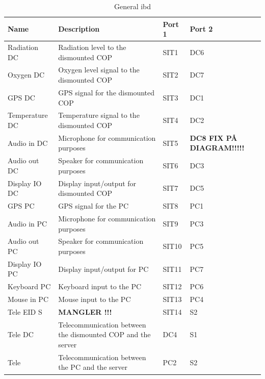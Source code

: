 \begin{table}[H]  
\centering

\begin{tabular}{|l|p{8cm}|l|l|} 
\hline
	\textbf{Name}		& \textbf{Description}						  & \textbf{Port 1} & \textbf{Port 2} \\\hline
  Radiation DC				&  Radiation level to the dismounted COP 	 					   & SIT1 & DC6 \\\hline
  Oxygen DC					&  Oxygen level signal to the dismounted COP				   & SIT2 & DC7 \\\hline
  GPS DC					&  GPS signal for the dismounted COP 	 					   & SIT3 & DC1 \\\hline   
  Temperature DC			&  Temperature signal to the dismounted COP 	 					   & SIT4 & DC2 \\\hline     
  Audio in DC				&  Microphone for communication purposes 	 				   & SIT5 &\textbf{ DC8  FIX PÅ DIAGRAM!!!!!}\\\hline     
  Audio out DC				&  Speaker for communication purposes 	 					   & SIT6 & DC3 \\\hline     
  Display IO DC				&  Display input/output for dismounted COP 	 					   & SIT7 & DC5 \\\hline     
  
  GPS PC					&  GPS signal for the PC			 	 					   & SIT8 & PC1 \\\hline     
  Audio in PC				&  Microphone for communication purposes 	 					   & SIT9 & PC3 \\\hline     
  Audio out PC				&  Speaker for communication purposes 	 					   & SIT10 & PC5 \\\hline     
  Display IO PC				&  Display input/output for PC 	 					   & SIT11 & PC7 \\\hline     
  Keyboard PC				&  Keyboard input to the PC 	 					   & SIT12 & PC6 \\\hline     
  Mouse in PC				&  Mouse input to the PC 	 					   & SIT13 & PC4 \\\hline    
  Tele EID S				&  \textbf{MANGLER !!!} 					   & SIT14 & S2 \\\hline
       
  Tele DC					&  Telecommunication between the dismounted COP and the server & DC4 & S1 \\\hline   
  Tele 						&  Telecommunication between the PC and the server 					   & PC2 & S2 \\\hline   
   
\end{tabular}
\caption {General ibd} 
\end{table} 







